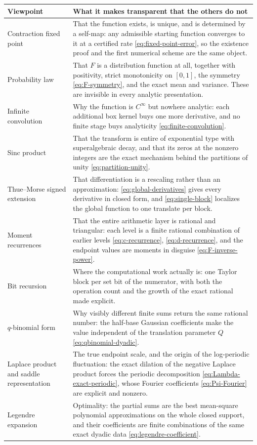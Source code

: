 \documentclass[11pt,oneside]{article}
\theoremstyle{definition}
\theoremstyle{remark}
\begin{document}
\begin{center}
\begin{tabularx}{0.96\textwidth}{@{}>{\raggedright\arraybackslash}p{}>{\raggedright\arraybackslash}X@{}}
\toprule
Viewpoint & What it makes transparent that the others do not\\
\midrule
Contraction fixed point &
That the function exists, is unique, and is determined by a self-map: any admissible starting
function converges to it at a certified rate \eqref{eq:fixed-point-error}, so the existence
proof and the first numerical scheme are the same object.\\
Probability law &
That $F$ is a distribution function at all, together with positivity, strict monotonicity on
$[0,1]$, the symmetry \eqref{eq:F-symmetry}, and the exact mean and variance.  These are
invisible in every analytic presentation.\\
Infinite convolution &
Why the function is $C^\infty$ but nowhere analytic: each additional box kernel buys one more
derivative, and no finite stage buys analyticity \eqref{eq:finite-convolution}.\\
Sinc product &
That the transform is entire of exponential type with superalgebraic decay, and that its
zeros at the nonzero integers are the exact mechanism behind the partitions of unity
\eqref{eq:partition-unity}.\\
Thue--Morse signed extension &
That differentiation is a rescaling rather than an approximation: \eqref{eq:global-derivatives}
gives every derivative in closed form, and \eqref{eq:single-block} localizes the global
function to one translate per block.\\
Moment recurrences &
That the entire arithmetic layer is rational and triangular: each level is a finite rational
combination of earlier levels \eqref{eq:c-recurrence}, \eqref{eq:d-recurrence}, and the
endpoint values are moments in disguise \eqref{eq:F-inverse-power}.\\
Bit recursion &
Where the computational work actually is: one Taylor block per set bit of the numerator, with
both the operation count and the growth of the exact rational made explicit.\\
$q$-binomial form &
Why visibly different finite sums return the same rational number: the half-base Gaussian
coefficients make the value independent of the translation parameter $Q$
\eqref{eq:qbinomial-dyadic}.\\
Laplace product and saddle representation &
The true endpoint scale, and the origin of the log-periodic fluctuation: the exact dilation
of the negative Laplace product forces the periodic decomposition
\eqref{eq:Lambda-exact-periodic}, whose Fourier coefficients \eqref{eq:Psi-Fourier} are
explicit and nonzero.\\
Legendre expansion &
Optimality: the partial sums are the best mean-square polynomial approximations on the whole
closed support, and their coefficients are finite combinations of the same exact dyadic data
\eqref{eq:legendre-coefficient}.\\
\bottomrule
\end{tabularx}
\end{center}
\end{document}
